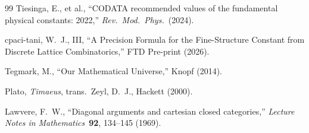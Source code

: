 \documentclass[11pt,twoside]{article}
\theoremstyle{definition}
\theoremstyle{plain}
\theoremstyle{remark}
\begin{document}
\begin{thebibliography}{99}
 Tiesinga, E., et al., ``CODATA recommended values of the fundamental physical constants: 2022,'' \textit{Rev.\ Mod.\ Phys.}\ (2024).

 cpaci-tani, W.~J., III, ``A Precision Formula for the Fine-Structure Constant from Discrete Lattice Combinatorics,'' FTD Pre-print (2026).

 Tegmark, M., ``Our Mathematical Universe,'' Knopf (2014).

 Plato, \textit{Timaeus}, trans.\ Zeyl, D.~J., Hackett (2000).

 Lawvere, F.~W., ``Diagonal arguments and cartesian closed categories,'' \textit{Lecture Notes in Mathematics}\ \textbf{92}, 134--145 (1969).
\end{thebibliography}
\end{document}
